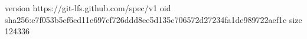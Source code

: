 version https://git-lfs.github.com/spec/v1
oid sha256:e7f053b5ef6cd11e697cf726ddd8ee5d135c706572d27234fa1de989722aef1c
size 124336
